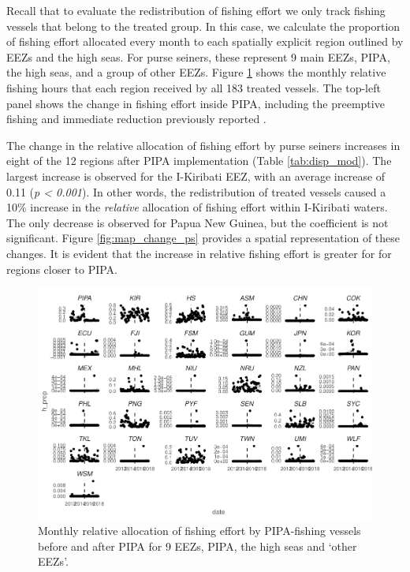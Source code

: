 \documentclass[12pt,]{article}
\begin{document}
Recall that to evaluate the redistribution of fishing effort we only
track fishing vessels that belong to the treated group. In this case, we
calculate the proportion of fishing effort allocated every month to each
spatially explicit region outlined by EEZs and the high seas. For purse
seiners, these represent 9 main EEZs, PIPA, the high seas, and a group
of other EEZs. Figure \ref{fig:redist_trend_ps} shows the monthly
relative fishing hours that each region received by all 183 treated
vessels. The top-left panel shows the change in fishing effort inside
PIPA, including the preemptive fishing and immediate reduction
previously reported \citep{mcdermott_2018}.

The change in the relative allocation of fishing effort by purse seiners
increases in eight of the 12 regions after PIPA implementation (Table
\ref{tab:disp_mod}). The largest increase is observed for the I-Kiribati
EEZ, with an average increase of 0.11 (\emph{p \textless{} 0.001}). In
other words, the redistribution of treated vessels caused a 10\%
increase in the \emph{relative} allocation of fishing effort within
I-Kiribati waters. The only decrease is observed for Papua New Guinea,
but the coefficient is not significant. Figure \ref{fig:map_change_ps}
provides a spatial representation of these changes. It is evident that
the increase in relative fishing effort is greater for for regions
closer to PIPA.

\begin{figure}
\centering
\includegraphics{Manuscript_files/figure-latex/unnamed-chunk-14-1.pdf}
\caption{\label{fig:unnamed-chunk-14}\label{fig:redist_trend_ps}Monthly
relative allocation of fishing effort by PIPA-fishing vessels before and
after PIPA for 9 EEZs, PIPA, the high seas and `other EEZs'.}
\end{figure}
\end{document}
